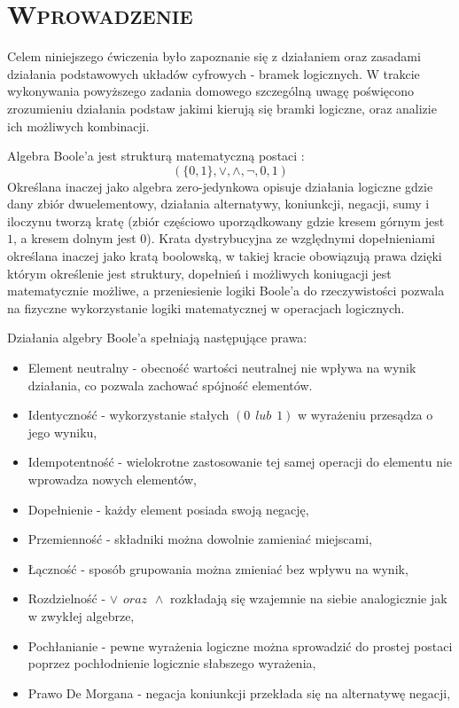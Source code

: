\documentclass[,a4paper,12pt]{article}
\renewcommand{\cite}{\supercite}
\begin{document}
\section{{\textsc{Wprowadzenie}}}
Celem niniejszego ćwiczenia było zapoznanie się z działaniem oraz zasadami działania podstawowych układów cyfrowych - bramek logicznych. W trakcie wykonywania powyższego zadania domowego szczególną uwagę poświęcono zrozumieniu działania podstaw jakimi kierują się bramki logiczne, oraz analizie ich możliwych kombinacji. \\\par
Algebra Boole'a jest strukturą matematyczną postaci :\cite{ligeza_elementy_logiki}
\begin{equation}
    (\{0,1\},\vee,\wedge,\neg,0,1)
\end{equation}
Określana inaczej jako algebra zero-jedynkowa opisuje działania logiczne gdzie dany zbiór dwuelementowy, działania alternatywy, koniunkcji, negacji, sumy i iloczynu tworzą kratę (zbiór częściowo uporządkowany gdzie kresem górnym jest $1$, a kresem dolnym jest $0$). Krata dystrybucyjna ze względnymi dopełnieniami określana inaczej jako kratą boolowską, w takiej kracie obowiązują prawa dzięki którym określenie jest struktury, dopełnień i możliwych koniugacji jest matematycznie możliwe, a przeniesienie logiki Boole'a do rzeczywistości pozwala na fizyczne wykorzystanie logiki matematycznej w operacjach logicznych.\cite{Zynel2009} \\ \par
Działania algebry Boole'a spełniają następujące prawa:
\begin{itemize}
    \item Element neutralny - obecność wartości neutralnej nie wpływa na wynik działania, co pozwala zachować spójność elementów.
    \item Identyczność - wykorzystanie stałych $(0\hspace{5pt}lub\hspace{5pt}1)$ w wyrażeniu przesądza o jego wyniku,
    \item Idempotentność - wielokrotne zastosowanie tej samej operacji do elementu nie wprowadza nowych elementów, 
    \item Dopełnienie - każdy element posiada swoją negację,
    \item Przemienność - składniki można dowolnie zamieniać miejscami,
    \item Łączność - sposób grupowania można zmieniać bez wpływu na wynik,
    \item Rozdzielność - $\vee \hspace{5pt}oraz\hspace{5pt}\wedge$ rozkładają się wzajemnie na siebie analogicznie jak w zwykłej algebrze,
    \item Pochłanianie - pewne wyrażenia logiczne można sprowadzić do prostej postaci poprzez pochłodnienie logicznie słabszego wyrażenia, 
    \item Prawo De Morgana - negacja koniunkcji przekłada się na alternatywę negacji, 
\end{itemize} \\ \par
\end{document}
